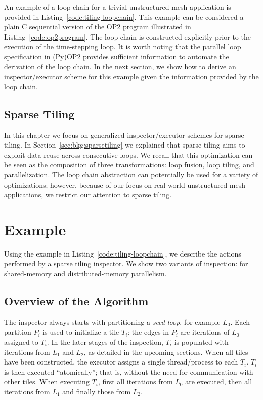 An example of a loop chain for a trivial unstructured mesh application is provided in Listing~\ref{code:tiling-loopchain}. This example can be considered a plain C sequential version of the OP2 program illustrated in Listing~\ref{code:op2program}. The loop chain is constructed explicitly prior to the execution of the time-stepping loop. It is worth noting that the parallel loop specification in (Py)OP2 provides sufficient information to automate the derivation of the loop chain. In the next section, we show how to derive an inspector/executor scheme for this example given the information provided by the loop chain.

\subsection{Sparse Tiling}
In this chapter we focus on generalized inspector/executor schemes for sparse tiling. In Section~\ref{sec:bkg:sparsetiling} we explained that sparse tiling aims to exploit data reuse across consecutive loops. We recall that this optimization can be seen as the composition of three transformations: loop fusion, loop tiling, and parallelization. The loop chain abstraction can potentially be used for a variety of optimizations; however, because of our focus on real-world unstructured mesh applications, we restrict our attention to sparse tiling.

\section{Example}
Using the example in Listing~\ref{code:tiling-loopchain}, we describe the actions performed by a sparse tiling inspector. We show two variants of inspection: for shared-memory and distributed-memory parallelism. 

\subsection*{Overview of the Algorithm}
The inspector always starts with partitioning a \textit{seed loop}, for example $L_0$. Each partition $P_i$ is used to initialize a tile $T_i$: the edges in $P_i$ are iterations of $L_0$ assigned to $T_i$. In the later stages of the inspection, $T_i$ is populated with iterations from $L_1$ and $L_2$, as detailed in the upcoming sections. When all tiles have been constructed, the executor assigns a single thread/process to each $T_i$. $T_i$ is then executed ``atomically''; that is, without the need for communication with other tiles. When executing $T_i$, first all iterations from $L_0$ are executed, then all iterations from $L_1$ and finally those from $L_2$. 

